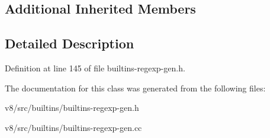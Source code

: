 \subsection*{Additional Inherited Members}


\subsection{Detailed Description}


Definition at line 145 of file builtins-\/regexp-\/gen.\+h.



The documentation for this class was generated from the following files\+:\begin{DoxyCompactItemize}
\item 
v8/src/builtins/builtins-\/regexp-\/gen.\+h\item 
v8/src/builtins/builtins-\/regexp-\/gen.\+cc\end{DoxyCompactItemize}
